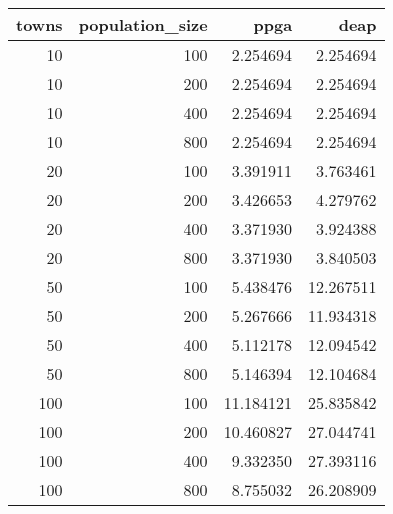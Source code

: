 \begin{tabular}{rrrr}
\toprule
towns & population_size & ppga & deap \\
\midrule
10 & 100 & 2.254694 & 2.254694 \\
10 & 200 & 2.254694 & 2.254694 \\
10 & 400 & 2.254694 & 2.254694 \\
10 & 800 & 2.254694 & 2.254694 \\
20 & 100 & 3.391911 & 3.763461 \\
20 & 200 & 3.426653 & 4.279762 \\
20 & 400 & 3.371930 & 3.924388 \\
20 & 800 & 3.371930 & 3.840503 \\
50 & 100 & 5.438476 & 12.267511 \\
50 & 200 & 5.267666 & 11.934318 \\
50 & 400 & 5.112178 & 12.094542 \\
50 & 800 & 5.146394 & 12.104684 \\
100 & 100 & 11.184121 & 25.835842 \\
100 & 200 & 10.460827 & 27.044741 \\
100 & 400 & 9.332350 & 27.393116 \\
100 & 800 & 8.755032 & 26.208909 \\
\bottomrule
\end{tabular}
